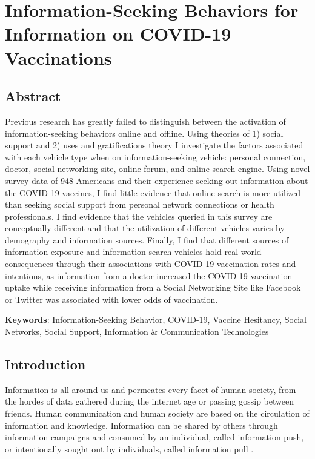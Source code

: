 \hypertarget{paper-2}{%
\chapter{Information-Seeking Behaviors for Information on COVID-19 Vaccinations}\label{paper-2}}

\hypertarget{abstract}{%
\section{Abstract}\label{abstract}}

Previous research has greatly failed to distinguish between the activation of
information-seeking behaviors online and offline. Using theories of 1) social
support and 2) uses and gratifications theory I investigate the factors associated
with each vehicle type when on information-seeking vehicle: personal connection,
doctor, social networking site, online forum, and online search engine. Using
novel survey data of 948 Americans and their experience seeking out
information about the COVID-19 vaccines, I find little evidence that online
search is more utilized than seeking social support from personal network
connections or health professionals. I find evidence that the vehicles queried
in this survey are conceptually different and that the utilization of different
vehicles varies by demography and information sources. Finally, I find that
different sources of information exposure and information search vehicles hold real
world consequences through their associations with COVID-19 vaccination rates
and intentions, as information from a doctor increased the COVID-19 vaccination
uptake while receiving information from a Social Networking Site like Facebook
or Twitter was associated with lower odds of vaccination.

\textbf{Keywords}: Information-Seeking Behavior, COVID-19, Vaccine Hesitancy, Social Networks, Social Support, Information \& Communication Technologies

\hypertarget{intro-1}{%
\section{Introduction}\label{intro-1}}

Information is all around us and permeates every facet of human society, from
the hordes of data gathered during the internet age or passing gossip between
friends. Human communication and human society are based on the circulation of
information and knowledge. Information can be shared by others through
information campaigns and consumed by an individual, called information push, or
intentionally sought out by individuals, called information pull
\citep{cybenkoFoundationsInformationPush1999}.

